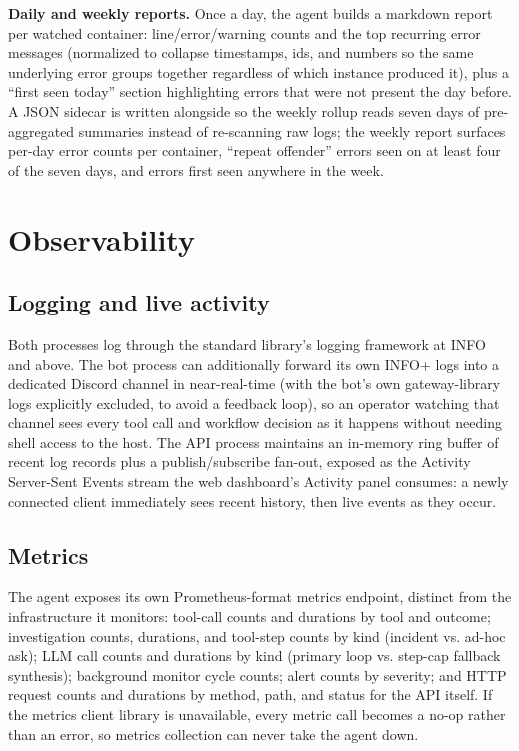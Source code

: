 \documentclass[11pt]{article}
\begin{document}
\textbf{Daily and weekly reports.} Once a day, the agent builds a markdown
report per watched container: line/error/warning counts and the top
recurring error messages (normalized to collapse timestamps, ids, and
numbers so the same underlying error groups together regardless of which
instance produced it), plus a ``first seen today'' section highlighting
errors that were not present the day before. A JSON sidecar is written
alongside so the weekly rollup reads seven days of pre-aggregated summaries
instead of re-scanning raw logs; the weekly report surfaces per-day error
counts per container, ``repeat offender'' errors seen on at least four of
the seven days, and errors first seen anywhere in the week.

\section{Observability}

\subsection{Logging and live activity}

Both processes log through the standard library's logging framework at INFO
and above. The bot process can additionally forward its own INFO+ logs into
a dedicated Discord channel in near-real-time (with the bot's own
gateway-library logs explicitly excluded, to avoid a feedback loop), so an
operator watching that channel sees every tool call and workflow decision as
it happens without needing shell access to the host. The API process
maintains an in-memory ring buffer of recent log records plus a
publish/subscribe fan-out, exposed as the Activity Server-Sent Events
stream the web dashboard's Activity panel consumes: a newly connected
client immediately sees recent history, then live events as they occur.

\subsection{Metrics}

The agent exposes its own Prometheus-format metrics endpoint, distinct from
the infrastructure it monitors: tool-call counts and durations by tool and
outcome; investigation counts, durations, and tool-step counts by kind
(incident vs. ad-hoc ask); LLM call counts and durations by kind (primary
loop vs. step-cap fallback synthesis); background monitor cycle counts;
alert counts by severity; and HTTP request counts and durations by method,
path, and status for the API itself. If the metrics client library is
unavailable, every metric call becomes a no-op rather than an error, so
metrics collection can never take the agent down.
\end{document}
